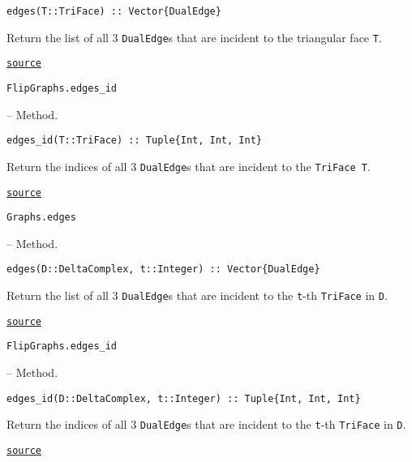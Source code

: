 \begin{adjustwidth}{2em}{0pt}


\begin{verbatim}
edges(T::TriFace) :: Vector{DualEdge}
\end{verbatim}

Return the list of all 3 \texttt{DualEdge}s that are incident to the triangular face \texttt{T}. 



\href{https://github.com/schto223/FlipGraphs.jl/blob/490c01a7adf74b42f27dda05099165c47ae8133e/src/deltaComplex.jl#L220-L224}{\texttt{source}}


\end{adjustwidth}
\hypertarget{10965646028083896720}{\texttt{FlipGraphs.edges\_id}}  -- {Method.}

\begin{adjustwidth}{2em}{0pt}


\begin{verbatim}
edges_id(T::TriFace) :: Tuple{Int, Int, Int}
\end{verbatim}

Return the indices of all 3 \texttt{DualEdge}s that are incident to the \texttt{TriFace T}. 



\href{https://github.com/schto223/FlipGraphs.jl/blob/490c01a7adf74b42f27dda05099165c47ae8133e/src/deltaComplex.jl#L241-L245}{\texttt{source}}


\end{adjustwidth}
\hypertarget{15082074870570804350}{\texttt{Graphs.edges}}  -- {Method.}

\begin{adjustwidth}{2em}{0pt}


\begin{verbatim}
edges(D::DeltaComplex, t::Integer) :: Vector{DualEdge}
\end{verbatim}

Return the list of all 3 \texttt{DualEdge}s that are incident to the \texttt{t}-th \texttt{TriFace} in \texttt{D}. 



\href{https://github.com/schto223/FlipGraphs.jl/blob/490c01a7adf74b42f27dda05099165c47ae8133e/src/deltaComplex.jl#L227-L231}{\texttt{source}}


\end{adjustwidth}
\hypertarget{16383920566377462491}{\texttt{FlipGraphs.edges\_id}}  -- {Method.}

\begin{adjustwidth}{2em}{0pt}


\begin{verbatim}
edges_id(D::DeltaComplex, t::Integer) :: Tuple{Int, Int, Int}
\end{verbatim}

Return the indices of all 3 \texttt{DualEdge}s that are incident to the \texttt{t}-th \texttt{TriFace} in \texttt{D}. 



\href{https://github.com/schto223/FlipGraphs.jl/blob/490c01a7adf74b42f27dda05099165c47ae8133e/src/deltaComplex.jl#L234-L238}{\texttt{source}}


\end{adjustwidth}

